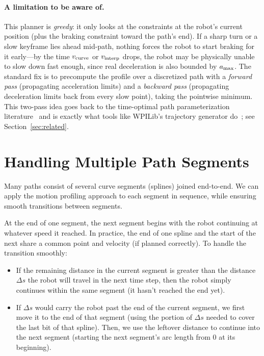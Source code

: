 \documentclass[11pt]{article}
\begin{document}
\paragraph{A limitation to be aware of.} This planner is \emph{greedy}: it only looks at the constraints at the robot's current position (plus the braking constraint toward the path's end). If a sharp turn or a slow keyframe lies ahead mid-path, nothing forces the robot to start braking for it early---by the time \(v_{\rm curve}\) or \(v_{\rm interp}\) drops, the robot may be physically unable to slow down fast enough, since real deceleration is also bounded by \(a_{\rm max}\). The standard fix is to precompute the profile over a discretized path with a \emph{forward pass} (propagating acceleration limits) and a \emph{backward pass} (propagating deceleration limits back from every slow point), taking the pointwise minimum. This two-pass idea goes back to the time-optimal path parameterization literature~\cite{bobrow,shinmckay,toppra} and is exactly what tools like WPILib's trajectory generator do~\cite{wpilib}; see Section~\ref{sec:related}.
\section{Handling Multiple Path Segments}

Many paths consist of several curve segments (splines) joined end-to-end. We can apply the motion profiling approach to each segment in sequence, while ensuring smooth transitions between segments.

At the end of one segment, the next segment begins with the robot continuing at whatever speed it reached. In practice, the end of one spline and the start of the next share a common point and velocity (if planned correctly). To handle the transition smoothly:
\begin{itemize}
  \item If the remaining distance in the current segment is greater than the distance $\Delta s$ the robot will travel in the next time step, then the robot simply continues within the same segment (it hasn't reached the end yet).
  \item If $\Delta s$ would carry the robot past the end of the current segment, we first move it to the end of that segment (using the portion of $\Delta s$ needed to cover the last bit of that spline). Then, we use the leftover distance to continue into the next segment (starting the next segment's arc length from 0 at its beginning).
\end{itemize}
\end{document}
